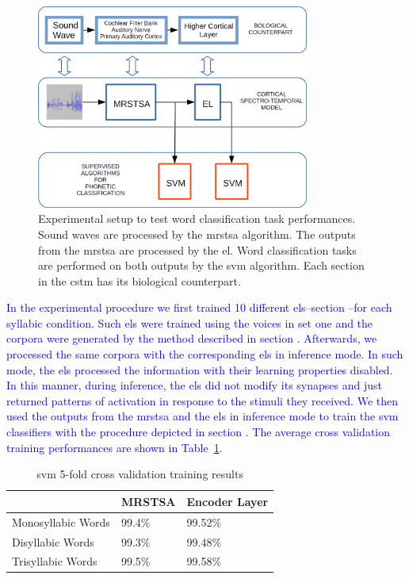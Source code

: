 \documentclass[10pt,letterpaper]{article}
\begin{document}
\begin{figure}[h!]
    \centering
    \includegraphics[width=0.8\textwidth]{Experiment.png}
    \caption{Experimental setup to test word classification task performances.
    Sound waves are processed by the \gls{mrstsa} algorithm.
    The outputs from the \gls{mrstsa} are processed by the \gls{el}.
    Word classification tasks are performed on both outputs by the \gls{svm} algorithm.
    Each section in the \gls{cstm} has its biological counterpart.}
    \label{fig:Experiment}
\end{figure}

\pagebreak

\textcolor{blue}{In the experimental procedure we first trained 10 different \glspl{el}--section --for each syllabic condition. Such \glspl{el} were trained using the voices in set one and the corpora were generated by the method described in section . Afterwards, we processed the same corpora with the corresponding \glspl{el} in inference mode. In such mode, the \glspl{el} processed the information with their learning properties disabled. In this manner, during inference, the \glspl{el} did not modify its synapses and just returned patterns of activation in response to the stimuli they received. We then used the outputs from the \gls{mrstsa} and the \glspl{el} in inference mode to train the \gls{svm} classifiers with the procedure depicted in section . The average cross validation training performances are shown in Table~\ref{SVM_Training}}.

\begin{table}[h!]
\centering
\caption{\gls{svm} 5-fold cross validation training results}
\begin{tabular}{|l|l|l|}
\hline
                   & MRSTSA & Encoder Layer \\ \hline
Monosyllabic Words & 99.4\% & 99.52\%          \\ \hline
Disyllabic Words   & 99.3\%   & 99.48\%        \\ \hline
Trisyllabic Words  & 99.5\% & 99.58\%          \\ \hline
\end{tabular}
\label{SVM_Training}
\end{table}
\end{document}
